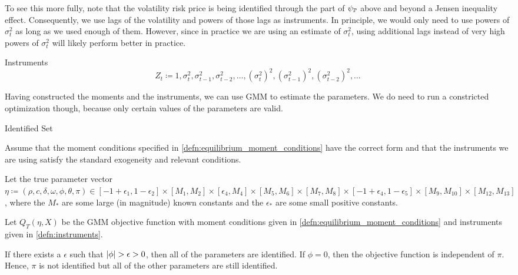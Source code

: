 \documentclass[11pt, letterpaper, twoside, final]{article}
\begin{document}
To see this more fully, note that the volatility risk price is being identified through the part of $\psi_{\mathbb{P}}$
above and beyond a Jensen inequality effect.
Consequently, we use lags of the volatility and powers of those lags as instruments.
In principle, we would only need to use powers of $\sigma^2_t$ as long as we used enough of them.
However, since in practice we are using an estimate of $\sigma^2_t$, using additional lags instead of very high
powers of $\sigma^2_t$ will likely perform better in practice.


\begin{defn}{Instruments}
    \label{defn:instruments}
    \begin{equation}
        Z_t \coloneqq 1, \sigma^2_{t}, \sigma^2_{t-1}, \sigma^2_{t-2}, \ldots, (\sigma^2_{t})^2,
        (\sigma^2_{t-1})^2, (\sigma^2_{t-2})^2, \ldots
    \end{equation}
\end{defn}

Having constructed the moments and the instruments, we can use GMM to estimate the parameters.
We do need to run a constricted optimization though, because only certain values of the parameters are valid. 

\begin{lemma}{Identified Set}
    
    Assume that the moment conditions specified in \cref{defn:equilibrium_moment_conditions} have the correct form
    and that the instruments we are using satisfy the standard exogeneity and relevant conditions. 

    Let the true parameter vector $\eta \coloneqq (\rho, c, \delta, \omega, \phi, \theta, \pi) \in [-1+\epsilon_1,
    1 - \epsilon_2] \times [M_1, M_2] \times [\epsilon_4, M_4]\times [M_5, M_6]\times [M_7, M_8] \times [-1 +
    \epsilon_4, 1 - \epsilon_5] \times [M_9, M_10] \times [M_12, M_13]$, where the $M_{\ast}$ are some large (in
    magnitude) known constants and the $\epsilon_{\ast}$ are some small positive constants.  

    Let $Q_T(\eta, X)$  be the GMM objective function with moment conditions given in
    \cref{defn:equilibrium_moment_conditions} and instruments given in  \cref{defn:instruments}.

    If there exists a $\epsilon$ such that $\lvert\phi\rvert > \epsilon > 0$, then all of the parameters are identified. 
    If $\phi = 0$, then the objective function is independent of $\pi$. 
    Hence, $\pi$ is not identified but all of the other parameters are still identified.

\end{lemma}
\end{document}
